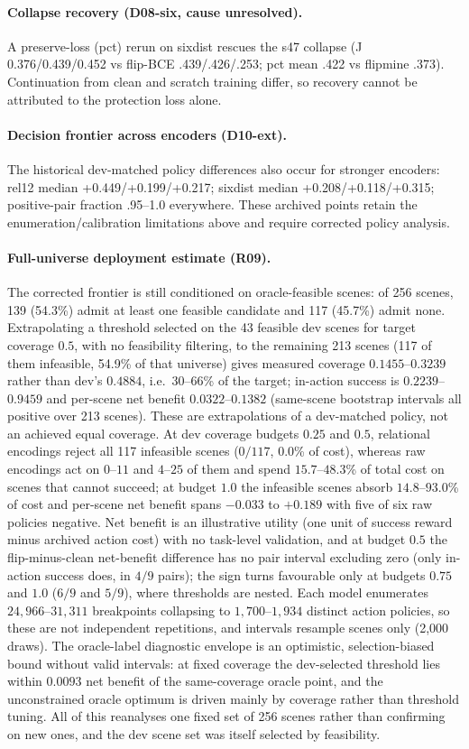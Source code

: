 \paragraph{Collapse recovery (D08-six, cause unresolved).} A preserve-loss (pct) rerun on sixdist rescues the s47 collapse (J 0.376/0.439/0.452 vs flip-BCE .439/.426/.253; pct mean .422 vs flipmine .373). Continuation from clean and scratch training differ, so recovery cannot be attributed to the protection loss alone.
\paragraph{Decision frontier across encoders (D10-ext).} The historical dev-matched policy differences also occur for stronger encoders: rel12 median +0.449/+0.199/+0.217; sixdist median +0.208/+0.118/+0.315; positive-pair fraction .95--1.0 everywhere. These archived points retain the enumeration/calibration limitations above and require corrected policy analysis.
\paragraph{Full-universe deployment estimate (R09).} The corrected frontier is still conditioned on oracle-feasible scenes: of 256 scenes, 139 (54.3\%) admit at least one feasible candidate and 117 (45.7\%) admit none. Extrapolating a threshold selected on the 43 feasible dev scenes for target coverage $0.5$, with no feasibility filtering, to the remaining 213 scenes (117 of them infeasible, 54.9\% of that universe) gives measured coverage $0.1455$--$0.3239$ rather than dev's $0.4884$, i.e.\ 30--66\% of the target; in-action success is $0.2239$--$0.9459$ and per-scene net benefit $0.0322$--$0.1382$ (same-scene bootstrap intervals all positive over 213 scenes). These are extrapolations of a dev-matched policy, not an achieved equal coverage. At dev coverage budgets $0.25$ and $0.5$, relational encodings reject all 117 infeasible scenes ($0/117$, $0.0$\% of cost), whereas raw encodings act on $0$--$11$ and $4$--$25$ of them and spend $15.7$--$48.3$\% of total cost on scenes that cannot succeed; at budget $1.0$ the infeasible scenes absorb $14.8$--$93.0$\% of cost and per-scene net benefit spans $-0.033$ to $+0.189$ with five of six raw policies negative. Net benefit is an illustrative utility (one unit of success reward minus archived action cost) with no task-level validation, and at budget $0.5$ the flip-minus-clean net-benefit difference has no pair interval excluding zero (only in-action success does, in $4/9$ pairs); the sign turns favourable only at budgets $0.75$ and $1.0$ ($6/9$ and $5/9$), where thresholds are nested. Each model enumerates $24{,}966$--$31{,}311$ breakpoints collapsing to $1{,}700$--$1{,}934$ distinct action policies, so these are not independent repetitions, and intervals resample scenes only (2,000 draws). The oracle-label diagnostic envelope is an optimistic, selection-biased bound without valid intervals: at fixed coverage the dev-selected threshold lies within $0.0093$ net benefit of the same-coverage oracle point, and the unconstrained oracle optimum is driven mainly by coverage rather than threshold tuning. All of this reanalyses one fixed set of 256 scenes rather than confirming on new ones, and the dev scene set was itself selected by feasibility.
